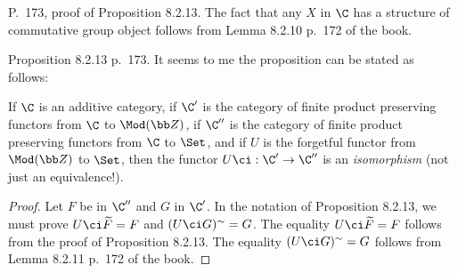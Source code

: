 \documentclass[12pt]{article}
\theoremstyle{remark}
\theoremstyle{definition}
\begin{document}
%

\begin{s} 
P.~173, proof of Proposition 8.2.13. The fact that any $X$ in $\C$ has a structure of commutative group object follows from Lemma 8.2.10 p.~172 of the book.
\end{s} 

%

\begin{s}
Proposition 8.2.13 p.~173. It seems to me the proposition can be stated as follows: 
\begin{prop}[Proposition 8.2.13 p.~173]
If $\C$ is an additive category, if $\C'$ is the category of finite product preserving functors from $\C$ to $\Mod(\bb Z)$, if $\C''$ is the category of finite product preserving functors from $\C$ to $\Set$, and if $U$ is the forgetful functor from $\Mod(\bb Z)$ to $\Set$, then the functor $U\ci:\C'\to\C''$ is an \emph{isomorphism} (not just an equivalence!). 
\end{prop}
\begin{proof}
Let $F$ be in $\C''$ and $G$ in $\C'$. In the notation of Proposition 8.2.13, we must prove $U\ci\widetilde F=F$ and $(U\ci G)^\sim=G$. The equality $U\ci\widetilde F=F$ follows from the proof of Proposition 8.2.13. The equality $(U\ci G)^\sim=G$ follows from Lemma 8.2.11 p.~172 of the book.
\end{proof} 
\end{s}  

% 
\end{document}
